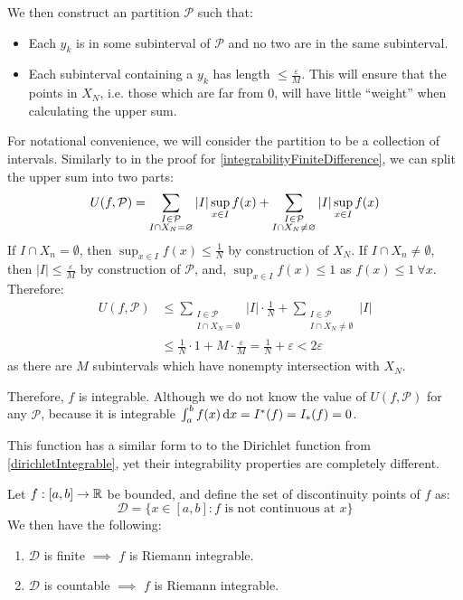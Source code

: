 \documentclass[../main.tex]{subfiles}
\begin{document}
\begin{example}
  We then construct an partition $\mathcal{P}$ such that:
  \begin{itemize}
    \item Each $y_k$ is in some subinterval of $\mathcal{P}$ and no two are in the same subinterval.
    \item Each subinterval containing a $y_k$ has length $\leq \frac{\varepsilon}{M}$.
      This will ensure that the points in $X_N$, i.e. those which are far from $0$, will have little ``weight'' when calculating the upper sum.
  \end{itemize}
  For notational convenience, we will consider the partition to be a collection of intervals.
  Similarly to in the proof for \cref{integrabilityFiniteDifference}, we can split the upper sum into two parts:
  \[
    U(f, \mathcal{P}) = \sum_{\substack{I \in \mathcal{P} \\ I \cap X_N = \emptyset}} |I| \sup_{x \in I} f(x) + \sum_{\substack{I \in \mathcal{P} \\ I \cap X_N \neq \emptyset}} |I| \sup_{x \in I} f(x) \\
  \]
  If $I \cap X_n = \emptyset$, then $\sup_{x \in I} f(x) \leq \frac{1}{N}$ by construction of $X_N$.
  If $I \cap X_n \neq \emptyset$, then $|I| \leq \frac{\varepsilon}{M}$ by construction of $\mathcal{P}$, and, $\sup_{x \in I} f(x) \leq 1$ as $f(x) \leq 1\ \forall x$.
  Therefore:
  \begin{align*}
    U(f, \mathcal{P}) &\leq \sum_{\substack{I \in \mathcal{P} \\ I \cap X_N = \emptyset}} |I| \cdot \frac{1}{N} + \sum_{\substack{I \in \mathcal{P} \\ I \cap X_N \neq \emptyset}} |I| \\
                      &\leq \frac{1}{N} \cdot 1 + M \cdot \frac{\varepsilon}{M} = \frac{1}{N} + \varepsilon < 2\varepsilon
  \end{align*}
  as there are $M$ subintervals which have nonempty intersection with $X_N$.

  Therefore, $f$ is integrable.
  Although we do not know the value of $U(f, \mathcal{P})$ for any $\mathcal{P}$, because it is integrable $\int_{a}^{b} f(x) \d{x} = I^{*}(f) = I_{*}(f) = 0$.

  This function has a similar form to to the Dirichlet function from \cref{dirichletIntegrable}, yet their integrability properties are completely different.
\end{example}
\begin{proposition}
  Let $f: [a, b] \to \R$ be bounded, and define the set of discontinuity points of $f$ as:
  \[
    \mathcal{D} = \{x \in [a, b]: f \text{ is not continuous at $x$}\}
  \]
  We then have the following:
  \begin{enumerate}
    \item $\mathcal{D}$ is finite $\implies$ $f$ is Riemann integrable.
    \item $\mathcal{D}$ is countable $\implies$ $f$ is Riemann integrable.
  \end{enumerate}
\end{proposition}
\end{document}
